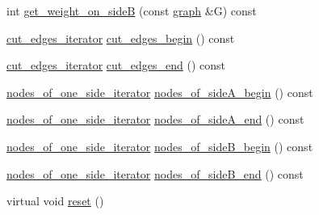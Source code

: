 \begin{DoxyCompactItemize}
\item 
int \mbox{\hyperlink{classfm__partition_a9e380da1dc654fcffdf4ac2418c6ef80}{get\+\_\+weight\+\_\+on\+\_\+sideB}} (const \mbox{\hyperlink{classgraph}{graph}} \&G) const
\item 
\mbox{\hyperlink{classfm__partition_a15e854cf1efcae91d05a48f2a9fd0761}{cut\+\_\+edges\+\_\+iterator}} \mbox{\hyperlink{classfm__partition_a36990b62c6d2d9e4948f42d805afc626}{cut\+\_\+edges\+\_\+begin}} () const
\item 
\mbox{\hyperlink{classfm__partition_a15e854cf1efcae91d05a48f2a9fd0761}{cut\+\_\+edges\+\_\+iterator}} \mbox{\hyperlink{classfm__partition_af213672f08e03878183659fa8c2ed61e}{cut\+\_\+edges\+\_\+end}} () const
\item 
\mbox{\hyperlink{classfm__partition_ad6cca73d48cc73d7bee1f52bf1c9a9fe}{nodes\+\_\+of\+\_\+one\+\_\+side\+\_\+iterator}} \mbox{\hyperlink{classfm__partition_adad3bf33efb4a2b1b0feadeafb33f5fd}{nodes\+\_\+of\+\_\+side\+A\+\_\+begin}} () const
\item 
\mbox{\hyperlink{classfm__partition_ad6cca73d48cc73d7bee1f52bf1c9a9fe}{nodes\+\_\+of\+\_\+one\+\_\+side\+\_\+iterator}} \mbox{\hyperlink{classfm__partition_ac4202d1d929c1700985ad5d452b735fb}{nodes\+\_\+of\+\_\+side\+A\+\_\+end}} () const
\item 
\mbox{\hyperlink{classfm__partition_ad6cca73d48cc73d7bee1f52bf1c9a9fe}{nodes\+\_\+of\+\_\+one\+\_\+side\+\_\+iterator}} \mbox{\hyperlink{classfm__partition_a4e433456ed0214c04466c4f1060b0909}{nodes\+\_\+of\+\_\+side\+B\+\_\+begin}} () const
\item 
\mbox{\hyperlink{classfm__partition_ad6cca73d48cc73d7bee1f52bf1c9a9fe}{nodes\+\_\+of\+\_\+one\+\_\+side\+\_\+iterator}} \mbox{\hyperlink{classfm__partition_a9682b070cce104bdfe69e576df57f560}{nodes\+\_\+of\+\_\+side\+B\+\_\+end}} () const
\item 
virtual void \mbox{\hyperlink{classfm__partition_a6db2eeb6ae968dbab78302f0448c0ced}{reset}} ()
\end{DoxyCompactItemize}
